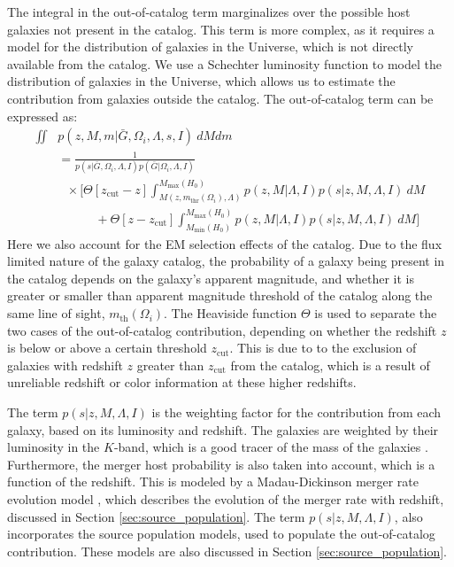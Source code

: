 The integral in the out-of-catalog term marginalizes over the possible host galaxies not present in the catalog. This term is more complex, as it requires a model for the distribution of galaxies in the Universe, which is not directly available from the catalog. We use a Schechter luminosity function to model the distribution of galaxies in the Universe, which allows us to estimate the contribution from galaxies outside the catalog. The out-of-catalog term can be expressed as:
\begin{align}
  \iint & p(z, M, m|\bar{G},\Omega_i, \Lambda, s, I)~dM dm \nonumber \\
  &= \frac{1}{p(s|\bar{G},\Omega_i, \Lambda, I)p(\bar{G}|\Omega_i, \Lambda, I)} \nonumber \\ 
  &~~~\times \Bigg[\Theta[z_{\mathrm{cut}} -z] \int_{M(z,m_{\mathrm{thr}}(\Omega_i), \Lambda)}^{M_{\mathrm{max}}(H_0)} p(z,M|\Lambda, I) p(s|z,M,\Lambda,I)~dM \nonumber \\
  &\qquad \quad + \Theta[z-z_{\mathrm{cut}}] \int_{M_{\mathrm{min}}(H_0)}^{M_{\mathrm{max}}(H_0)} p(z,M|\Lambda, I) p(s|z,M,\Lambda,I)~dM \Bigg]
\end{align}
Here we also account for the \ac{EM} selection effects of the catalog. Due to the flux limited nature of the galaxy catalog, the probability of a galaxy being present in the catalog depends on the galaxy's apparent magnitude, and whether it is greater or smaller than apparent magnitude threshold of the catalog along the same line of sight, $m_{\mathrm{th}}(\Omega_i)$. The Heaviside function $\Theta$ is used to separate the two cases of the out-of-catalog contribution, depending on whether the redshift $z$ is below or above a certain threshold $z_{\mathrm{cut}}$. This is due to to the exclusion of galaxies with redshift $z$ greater than $z_{\mathrm{cut}}$ from the catalog, which is a result of unreliable redshift or color information at these higher redshifts.

The term $p(s|z,M,\Lambda,I)$ is the weighting factor for the contribution from each galaxy, based on its luminosity and redshift. The galaxies are weighted by their luminosity in the $K$-band, which is a good tracer of the mass of the galaxies \citep{strazzullo2006near,sureshkumar2021galaxy}. Furthermore, the merger host probability is also taken into account, which is a function of the redshift. This is modeled by a Madau-Dickinson merger rate evolution model \citep{madau2014cosmic}, which describes the evolution of the merger rate with redshift, discussed in Section \ref{sec:source_population}. The term $p(s|z,M,\Lambda,I)$, also incorporates the source population models, used to populate the out-of-catalog contribution. These models are also discussed in Section \ref{sec:source_population}.

